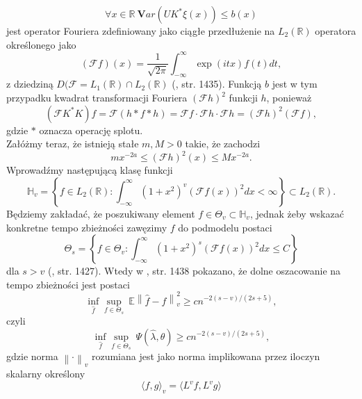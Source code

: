 \documentclass[man,mfiu]{mgrwms}
\newcommand{\norm}[1]{\left\lVert#1\right\rVert}
\begin{document}
\begin{equation}\label{3}
\forall x\in \mathbb{R}\ \pmb{V}ar(UK^*\xi (x))\leq b(x)
\end{equation}
jest operator Fouriera  zdefiniowany jako ciągłe przedłużenie na $L_2(\mathbb{R})$ operatora określonego jako
\begin{displaymath}
(\mathcal{F}f)(x)=\frac{1}{\sqrt{2\pi}}\int_{-\infty}^{\infty}\exp (itx)f(t)dt,
\end{displaymath}
z dziedziną $D(\mathcal{F}= L_1(\mathbb{R})\cap L_2(\mathbb{R})$ (\cite{mair}, str. 1435). Funkcją $b$ jest w tym przypadku kwadrat transformacji Fouriera $(\mathcal{F}h)^2$ funkcji $h$, ponieważ 
\begin{displaymath}
\left(\mathcal{F}K^*K\right)f =\mathcal{F}(h\ast f\ast h)=\mathcal{F}f\cdot \mathcal{F}h\cdot \mathcal{F}h =\left(\mathcal{F}h\right)^2\left(\mathcal{F}f\right),
\end{displaymath}
gdzie $\ast$ oznacza operację splotu.\\
Załóżmy teraz, że istnieją stałe $m,M>0$ takie, że zachodzi 
\begin{displaymath}
mx^{-2a}\leq (\mathcal{F}h)^2(x)\leq Mx^{-2a}.
\end{displaymath}
Wprowadźmy następującą klasę funkcji
\begin{displaymath}
\mathbb{H}_v=\left\{f\in L_2(\mathbb{R})\colon \int_{-\infty}^{\infty}(1+x^2)^v(\mathcal{F}f(x))^2dx<\infty\right\}\subset L_2(\mathbb{R}).
\end{displaymath}
Będziemy zakładać, że poszukiwany element $f\in \Theta_v\subset \mathbb{H}_v$, jednak żeby wskazać konkretne tempo zbieżności zawęzimy $f$ do podmodelu postaci
\begin{displaymath}
\Theta_s=\left\{f\in\Theta_v\colon \int_{-\infty}^{\infty}(1+x^2)^s(\mathcal{F}f(x))^2dx \leq C\right\}
\end{displaymath}
dla $s>v$ (\cite{mair}, str. 1427). Wtedy w \cite{mair}, str. 1438 pokazano, że dolne oszacowanie na tempo zbieżności jest postaci
\begin{displaymath}
\inf_{\hat{f}}\sup_{f\in\Theta_s}\ \mathbb{E}\norm{\hat{f}-f}_v^2\geq cn^{-2(s-v)/(2s+5)},
\end{displaymath}
czyli
\begin{displaymath}
\inf_{\hat{f}}\sup_{f\in\Theta_s}\ \Psi(\hat{\lambda},\theta)\geq cn^{-2(s-v)/(2s+5)},
\end{displaymath}
gdzie norma $\norm{\cdot}_v$ rozumiana jest jako norma implikowana przez iloczyn skalarny określony 
\begin{displaymath}
\langle f,g\rangle_v=\langle L^vf,L^vg\rangle
\end{displaymath}
\end{document}
